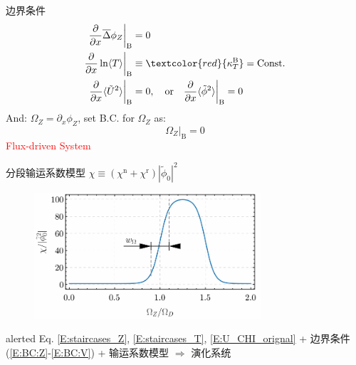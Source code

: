\documentclass[9pt,aspectratio=169]{ctexbeamer}
\begin{document}
\begin{frame}{\secname}{\subsecname}
  \vspace{-0.6cm}
  \begin{minipage}[t]{0.41\textwidth}
    \begin{exampleblock}{边界条件}
      \vspace{-0.5cm}
      \begin{align}
        \dfrac{\partial}{\partial x}\overline{\Delta}\phi_Z \bigg\vert_{\mathrm{B}}&=0\label{E:BC:Z}\\
        \dfrac{\partial}{\partial x}\ln \langle T\rangle \bigg\vert_{\mathrm{B}}&\equiv \textcolor{red}{\kappa_T^{\mathrm{B}}} = \mathrm{Const.}\label{E:BC:T}\\
        \dfrac{\partial}{\partial x}\langle\tilde{U}^2\rangle \bigg\vert_{\mathrm{B}}&=0,\quad \mathrm{or} \quad \dfrac{\partial}{\partial x}\langle\tilde{\phi}^2\rangle \bigg\vert_{\mathrm{B}}=0\label{E:BC:U}
      \end{align}
      And: $ \Omega_Z=\partial_x\phi_Z $, set B.C. for $ \Omega_Z $ as:
      \begin{equation}\label{E:BC:V}
        \Omega_Z \bigg\vert_{\mathrm{B}} =0
      \end{equation}
      \textcolor{red}{Flux-driven System}
    \end{exampleblock}
  \end{minipage}
  \hspace{0.04\textwidth}
  \begin{minipage}[t]{0.53\textwidth}
    \begin{exampleblock}{分段输运系数模型 \small $ \chi \equiv (\chi^{\text{n}} + \chi^{\text{r}})|\tilde{\phi}_0|^2 $}
      \vspace{0cm}
      \begin{figure}[b]
        \centering
        \includegraphics[width=0.75\textwidth]{figures/chiModel2D.pdf}
      \end{figure}
      \vspace{-0.3cm}
    \end{exampleblock}
    \vspace{-0.2cm}
    \begin{tbox}{alerted}
      \small Eq. \eqref{E:staircases_Z}, \eqref{E:staircases_T}, \eqref{E:U_CHI_orignal} + 边界条件 (\ref{E:BC:Z}-\ref{E:BC:V}) + 输运系数模型 $ \Longrightarrow $ 演化系统
    \end{tbox}
  \end{minipage}
\end{frame}
\end{document}
